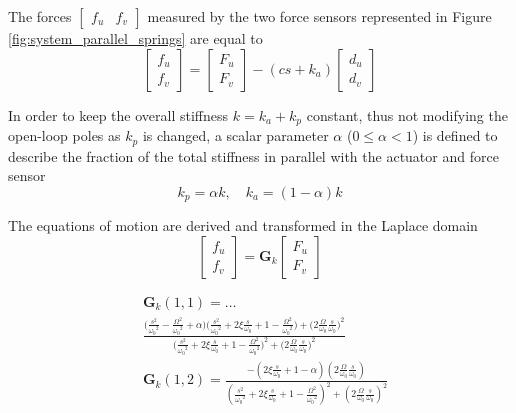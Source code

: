 \documentclass[10pt]{iopart}
\begin{document}
\par
The forces \(\begin{bmatrix}f_u & f_v\end{bmatrix}\) measured by the two force sensors represented in Figure \ref{fig:system_parallel_springs} are equal to
\begin{equation}
\label{eq:measured_force_kp}
  \begin{bmatrix} f_{u} \\ f_{v} \end{bmatrix} =
  \begin{bmatrix} F_u \\ F_v \end{bmatrix} - (c s + k_a)
  \begin{bmatrix} d_u \\ d_v \end{bmatrix}
\end{equation}

In order to keep the overall stiffness \(k = k_a + k_p\) constant, thus not modifying the open-loop poles as \(k_p\) is changed, a scalar parameter \(\alpha\) (\(0 \le \alpha < 1\)) is defined to describe the fraction of the total stiffness in parallel with the actuator and force sensor
\begin{equation}
  k_p = \alpha k, \quad k_a = (1 - \alpha) k
\end{equation}

The equations of motion are derived and transformed in the Laplace domain
\begin{equation}
\label{eq:Gk_mimo_tf}
  \begin{bmatrix} f_u \\ f_v \end{bmatrix} =
  \mathbf{G}_k
  \begin{bmatrix} F_u \\ F_v \end{bmatrix}
\end{equation}

\begin{subequations}
\label{eq:Gk}
\begin{align}
& \mathbf{G}_{k}(1,1) = \dots \nonumber \\
& {\scriptstyle \frac{\big( \frac{s^2}{{\omega_0}^2} - \frac{\Omega^2}{{\omega_0}^2} + \alpha \big) \big( \frac{s^2}{{\omega_0}^2} + 2 \xi \frac{s}{\omega_0} + 1 - \frac{{\Omega}^2}{{\omega_0}^2} \big) + \big( 2 \frac{\Omega}{\omega_0} \frac{s}{\omega_0} \big)^2}{\big( \frac{s^2}{{\omega_0}^2} + 2 \xi \frac{s}{\omega_0} + 1 - \frac{{\Omega}^2}{{\omega_0}^2} \big)^2 + \big( 2 \frac{\Omega}{\omega_0} \frac{s}{\omega_0} \big)^2} } \\
& \mathbf{G}_{k}(1,2) = {\scriptscriptstyle \frac{- \left( 2 \xi \frac{s}{\omega_0} + 1 - \alpha \right) \left( 2 \frac{\Omega}{\omega_0} \frac{s}{\omega_0} \right)}{\left( \frac{s^2}{{\omega_0}^2} + 2 \xi \frac{s}{\omega_0} + 1 - \frac{{\Omega}^2}{{\omega_0}^2} \right)^2 + \left( 2 \frac{\Omega}{\omega_0} \frac{s}{\omega_0} \right)^2} }
\end{align}
\end{subequations}
\end{document}
